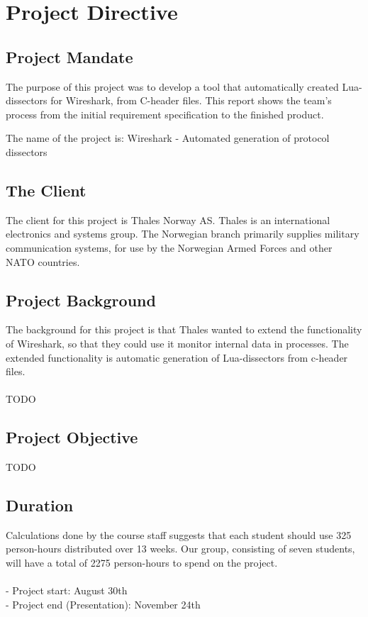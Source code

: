 \chapter{Project Directive}


\section{Project Mandate}
The purpose of this project was to develop a tool that automatically created Lua-dissectors for Wireshark, from C-header files. This report shows the team’s process from the initial requirement specification to the finished product. 

The name of the project is: Wireshark - Automated generation of protocol dissectors

\section{The Client}
The client for this project is Thales Norway AS. Thales is an international electronics and systems group. The Norwegian branch primarily supplies military communication systems, for use by the Norwegian Armed Forces and other NATO countries.

\section{Project Background}
The background for this project is that Thales wanted to extend the functionality of Wireshark, so that they could use it monitor internal data in processes. The extended functionality is automatic generation of Lua-dissectors from c-header files.
\\\\
TODO

\section{Project Objective}
TODO

\section{Duration}
Calculations done by the course staff suggests that each student should use 325 person-hours distributed over 13 weeks. Our group, consisting of seven students, will have a total of 2275 person-hours to spend on the project.\\
\\- Project start: August 30th
\\- Project end (Presentation): November 24th


